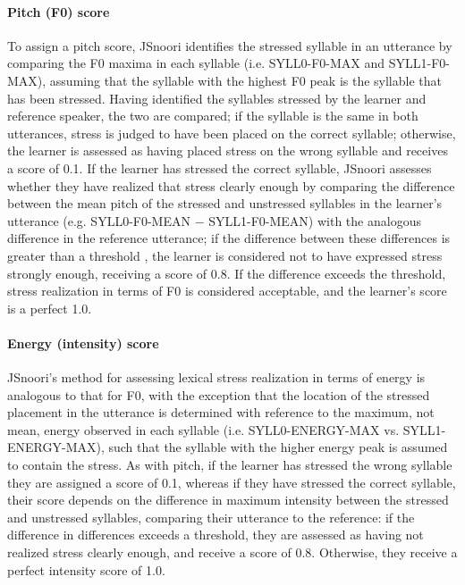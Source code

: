 	
	\paragraph{Pitch (F0) score}
	
	To assign a pitch score, JSnoori identifies the stressed syllable in an utterance  by comparing the F0 maxima in each syllable (i.e. SYLL0-F0-MAX and SYLL1-F0-MAX), assuming that the syllable with the highest F0 peak is the syllable that has been stressed. 
	 Having identified the syllables stressed by the learner and reference speaker, the two are compared;
	if the syllable is the same in both utterances, stress is judged to have been placed on the correct syllable; otherwise, the learner is assessed as having placed stress on the wrong syllable and receives a score of 0.1. If the learner has stressed the correct syllable, JSnoori assesses whether they have realized that stress clearly enough by comparing the difference between the mean pitch of the stressed and unstressed syllables in the learner's utterance (e.g. SYLL0-F0-MEAN $-$ SYLL1-F0-MEAN) with the analogous difference in the reference utterance; if the difference between these differences is greater than a threshold , the learner is considered not to have expressed stress strongly enough, receiving a score of 0.8. If the difference exceeds the threshold, stress realization in terms of F0 is considered acceptable, and the learner's score is a perfect 1.0.
	
	
	\paragraph{Energy (intensity) score}
	
	JSnoori's method for assessing lexical stress realization in terms of energy is analogous to that for F0, with the exception that the location of the stressed placement in the utterance is determined with reference to the maximum, not mean, energy observed in each syllable (i.e. SYLL0-ENERGY-MAX vs. SYLL1-ENERGY-MAX), such that the syllable with the higher energy peak is assumed to contain the stress.  
	As with pitch, if the learner has stressed the wrong syllable they are assigned a score of 0.1, whereas if they have stressed the correct syllable, their score depends on the difference in maximum intensity between the stressed and unstressed syllables, comparing their utterance to the reference: if the difference in differences exceeds a threshold, they are assessed as having not realized stress clearly enough, and receive a score of 0.8. Otherwise, they receive a perfect intensity score of 1.0.



